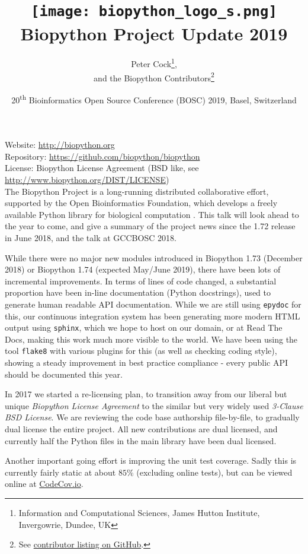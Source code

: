 \documentclass[10pt,oneside]{article}
\title{%
\vspace{-1.5in}
\texttt{[image: biopython\_logo\_s.png]} \\
\vspace{3mm}Biopython Project Update 2019}
\author{
    Peter Cock\thanks{Information and Computational Sciences, James Hutton Institute, Invergowrie, Dundee, UK},\\
    and the Biopython Contributors\thanks{See \href{https://github.com/biopython/biopython/blob/master/CONTRIB.rst}{contributor listing on GitHub}.}}
\date{20\textsuperscript{th} Bioinformatics Open Source Conference (BOSC) 2019, Basel, Switzerland}
\begin{document}
\maketitle
\thispagestyle{empty}

\vspace{-0.2in}
\noindent
Website: \url{http://biopython.org} \\
Repository: \url{https://github.com/biopython/biopython} \\
License: Biopython License Agreement (BSD like, see \url{http://www.biopython.org/DIST/LICENSE}) \\

The Biopython Project is a long-running distributed collaborative effort,
supported by the Open Bioinformatics Foundation, which develops a freely
available Python library for biological computation \cite{AppNote}. This
talk will look ahead to the year to come, and give a summary of the project
news since the 1.72 release in June 2018, and the talk at GCCBOSC 2018.

While there were no major new modules introduced in Biopython 1.73
(December 2018) or Biopython 1.74 (expected May/June 2019), there have
been lots of incremental improvements.
In terms of lines of code changed, a substantial proportion have been
in-line documentation (Python docstrings), used to generate human readable
API documentation. While we are still using \texttt{epydoc} for this, our continuous
integration system has been generating more modern HTML output using \texttt{sphinx},
which we hope to host on our domain, or at Read The Docs, making this work
much more visible to the world. We have been using the tool \texttt{flake8}
with various plugins for this (as well as checking coding style), showing
a steady improvement in best practice compliance - every public API should
be documented this year.

In 2017 we started a re-licensing plan, to transition away
from our liberal but unique \emph{Biopython License Agreement} to the similar
but very widely used \emph{3-Clause BSD License}. We are reviewing the code
base authorship file-by-file, to gradually dual license the entire project.
All new contributions are dual licensed, and currently half the Python files
in the main library have been dual licensed.

Another important going effort is improving the unit test coverage. Sadly
this is currently fairly static at about $85\%$ (excluding online tests),
but can be viewed online at
\href{https://codecov.io/github/biopython/biopython/}{CodeCov.io}.
\end{document}
